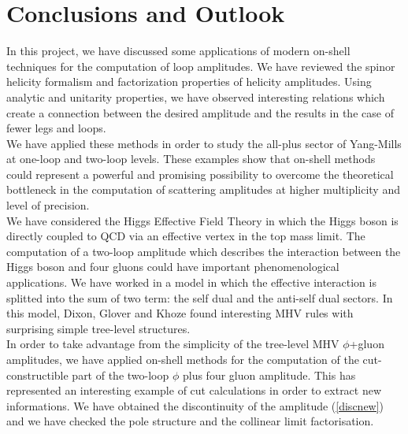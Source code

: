 \chapter{Conclusions and Outlook}
In this project, we have discussed some applications of modern on-shell techniques for the computation of loop amplitudes. We have reviewed the spinor helicity formalism and factorization properties of helicity amplitudes. Using analytic and unitarity properties, we have observed interesting relations which create a connection between the desired amplitude and the results in the case of fewer legs and loops.\\
We have applied these methods in order to study the all-plus sector of Yang-Mills at one-loop and two-loop levels. These examples show that on-shell methods could represent a powerful and promising possibility to overcome the theoretical bottleneck in the computation of scattering amplitudes at higher multiplicity and level of precision.\\

We have considered the Higgs Effective Field Theory in which the Higgs boson is directly coupled to QCD via an effective vertex in the top mass limit. The computation of a two-loop amplitude which describes the interaction between the Higgs boson and four gluons could have important phenomenological applications. We have worked in a model in which the effective interaction is splitted into the sum of two term: the self dual and the anti-self dual sectors. In this model, Dixon, Glover and Khoze \cite{Dixon_2004} found interesting MHV rules with surprising simple tree-level structures.\\
In order to take advantage from the simplicity of the tree-level MHV $\phi$+gluon amplitudes, we have applied on-shell methods for the computation of the cut-constructible part of the two-loop $\phi$ plus four gluon amplitude. This has represented an interesting example of cut calculations in order to extract new informations. We have obtained the discontinuity of the amplitude (\ref{discnew}) and we have checked the pole structure and the collinear limit factorisation.\\

